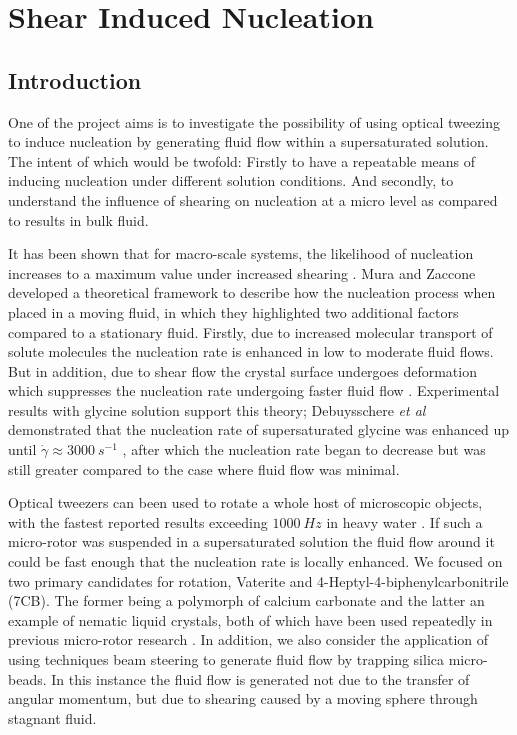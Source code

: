 \chapter{Shear Induced Nucleation}
\section{Introduction}
One of the project aims is to investigate the possibility of using
optical tweezing to induce nucleation by generating fluid flow 
within a supersaturated solution. The intent of which would be 
twofold: Firstly to have a repeatable means of inducing nucleation
under different solution conditions. And secondly, to understand 
the influence of shearing on nucleation at a micro level as 
compared to results in bulk fluid.

It has been shown that for macro-scale systems, the likelihood of 
nucleation increases to a maximum value under increased shearing 
\cite{Debuysschere2023, Mura2016}. Mura and Zaccone developed a 
theoretical framework to describe how the nucleation process when
placed in a moving fluid, in which they highlighted two additional 
factors compared to a stationary fluid. Firstly, due to increased 
molecular transport of solute molecules the nucleation rate is 
enhanced in low to moderate fluid flows. But in addition, due to 
shear flow the crystal surface undergoes deformation which suppresses 
the nucleation rate undergoing faster fluid flow \cite{Mura2016}. Experimental results with glycine solution support this theory; 
Debuysschere \textit{et al} demonstrated that the nucleation rate 
of supersaturated glycine was enhanced up until $\dot{\gamma}\approx3000\ s^{-1}$ \cite{Debuysschere2023}, after which the nucleation rate 
began to decrease but was still greater compared to the case where 
fluid flow was minimal.

Optical tweezers can been used to rotate a whole host of microscopic 
objects, with the fastest reported results exceeding $1000\ Hz$ in 
heavy water \cite{Arita2016}. If such a micro-rotor was suspended in
a supersaturated solution the fluid flow around it could be fast enough
that the nucleation rate is locally enhanced. We focused on two 
primary candidates for rotation, Vaterite and 
4-Heptyl-4-biphenylcarbonitrile (7CB). The former being a polymorph of 
calcium carbonate and the latter an example of nematic liquid crystals, 
both of which have been used repeatedly in previous micro-rotor research
\cite{Saito2022, Arita2016, Parkin2009}. In addition, we also consider 
the application of using techniques beam steering to generate fluid 
flow by trapping silica micro-beads. In this instance the fluid flow is 
generated not due to the transfer of angular momentum, but due to 
shearing caused by a moving sphere through stagnant fluid.


